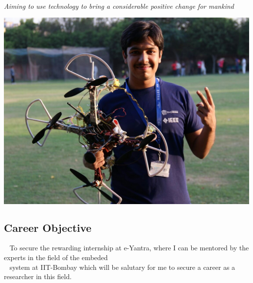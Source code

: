 \documentclass[11pt]{article}
\begin{document}
\begin{mdframed}[backgroundcolor=orange]
~
\begin{center}
\begin{Huge}
\end{Huge}
\end{center}
\begin{center}
\begin{large}
\color{white}\emph{Aiming to use technology to bring a considerable positive change for mankind}
\end{large}
\end{center}
\end{mdframed}
\begin{minipage}{1.00\linewidth}
\begin{center}
\includegraphics[scale=0.169]{siddhant_image}
\end{center}

\begin{flushleft}
\section{\color{red}Car\color{purple}e\color{black}er Obje\color{purple}ct\color{black}ive}
~
To secure the rewarding internship at e-Yantra, where I can be mentored by the experts in the field of the embeded\\~ system at IIT-Bombay which will be salutary for me to secure a career as a researcher in this field.

\end{flushleft}
\end{minipage}
\end{document}
